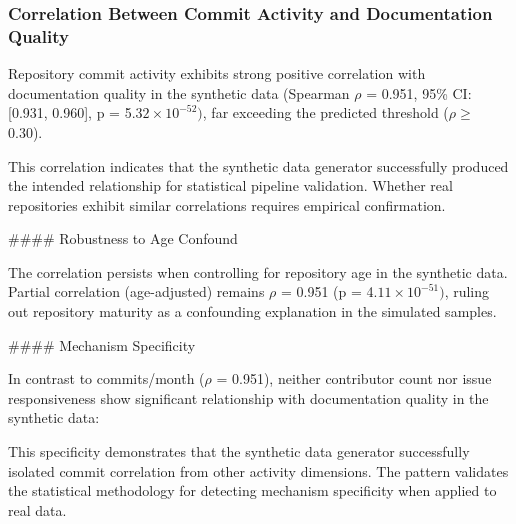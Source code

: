 \subsubsection{Correlation Between Commit Activity and Documentation Quality}

Repository commit activity exhibits strong positive correlation with documentation quality in the synthetic data (Spearman $\rho$ = 0.951, 95\% CI: [0.931, 0.960], p = 5.$32\times 10^{-52})$, far exceeding the predicted threshold ($\rho \geq$ 0.30).

This correlation indicates that the synthetic data generator successfully produced the intended relationship for statistical pipeline validation. Whether real repositories exhibit similar correlations requires empirical confirmation.

\#\#\#\# Robustness to Age Confound

The correlation persists when controlling for repository age in the synthetic data. Partial correlation (age-adjusted) remains $\rho$ = 0.951 (p = 4.$11\times 10^{-51})$, ruling out repository maturity as a confounding explanation in the simulated samples.

\#\#\#\# Mechanism Specificity

In contrast to commits/month ($\rho$ = 0.951), neither contributor count nor issue responsiveness show significant relationship with documentation quality in the synthetic data:

\begin{table}[htbp]
\centering
{}
\end{table}

This specificity demonstrates that the synthetic data generator successfully isolated commit correlation from other activity dimensions. The pattern validates the statistical methodology for detecting mechanism specificity when applied to real data.

